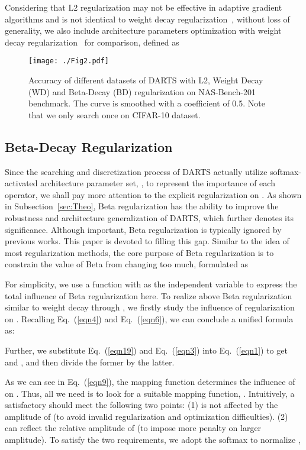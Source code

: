 \documentclass[10pt,twocolumn,letterpaper]{article}
\begin{document}
Considering that L2 regularization may not be effective in adaptive gradient algorithms and is not identical to weight decay regularization~\cite{dwd}, without loss of generality, we also include architecture parameters optimization with weight decay regularization~\cite{hanson1988comparing} for comparison, defined as


\begin{figure*}[t] 
	\centering
\texttt{[image: ./Fig2.pdf]}
\vspace{-12pt}
	\caption{Accuracy of different datasets
of DARTS with L2, Weight Decay (WD) and Beta-Decay (BD) regularization on NAS-Bench-201 benchmark. The curve is smoothed with a coefficient of 0.5. Note that we only search once on CIFAR-10 dataset.}
	\label{fig:3}
	\vspace{-10pt}	
\end{figure*}

\subsection{Beta-Decay Regularization}
Since the searching and discretization process of DARTS actually utilize softmax-activated architecture parameter set, , to represent the importance of each operator, we shall pay more attention to the explicit regularization on . 
As shown in Subsection~\ref{sec:Theo}, Beta regularization has the ability to improve the robustness and architecture generalization of DARTS, which further denotes its significance. Although important, Beta regularization is typically ignored by previous works. This paper is devoted to filling this gap. Similar to the idea of most regularization methods, the core purpose of Beta regularization is to constrain the value of Beta from changing too much, formulated as


For simplicity, we use a  function with  as the independent variable to express the total influence of Beta regularization here. To realize above Beta regularization similar to weight decay through , we firstly study the influence of  regularization on . Recalling Eq.~(\ref{eqn4}) and Eq.~(\ref{eqn6}), we can conclude a unified formula as: 


Further, we substitute Eq.~(\ref{eqn19}) and Eq.~(\ref{eqn3}) into Eq.~(\ref{eqn1}) to get  and , and then divide the former by the latter.


As we can see in Eq.~(\ref{eqn9}), the mapping function  determines the influence of  on . Thus, all we need is to look for a suitable mapping function, . Intuitively, a satisfactory  should meet the following two points: (1)  is not affected by the amplitude of  (to avoid invalid regularization and optimization difficulties). 
(2)  can reflect the relative amplitude of  (to impose more penalty on larger amplitude). 
To satisfy the two requirements, we adopt the softmax to normalize , 
\end{document}
